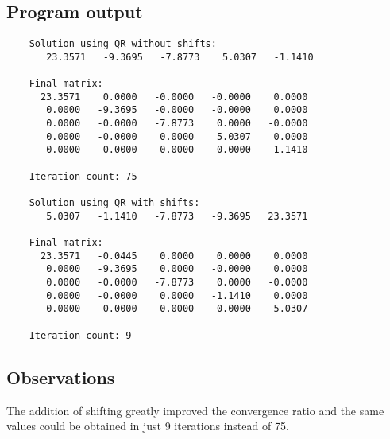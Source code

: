 \documentclass{article}
\begin{document}
	\newpage
	\subsection{Program output}

	\begin{verbatim}
	Solution using QR without shifts:
	   23.3571   -9.3695   -7.8773    5.0307   -1.1410

	Final matrix:
	  23.3571    0.0000   -0.0000   -0.0000    0.0000
	   0.0000   -9.3695   -0.0000   -0.0000    0.0000
	   0.0000   -0.0000   -7.8773    0.0000   -0.0000
	   0.0000   -0.0000    0.0000    5.0307    0.0000
	   0.0000    0.0000    0.0000    0.0000   -1.1410

	Iteration count: 75

	Solution using QR with shifts:
	   5.0307   -1.1410   -7.8773   -9.3695   23.3571

	Final matrix:
	  23.3571   -0.0445    0.0000    0.0000    0.0000
	   0.0000   -9.3695    0.0000   -0.0000    0.0000
	   0.0000   -0.0000   -7.8773    0.0000   -0.0000
	   0.0000   -0.0000    0.0000   -1.1410    0.0000
	   0.0000    0.0000    0.0000    0.0000    5.0307

	Iteration count: 9
	\end{verbatim}

	\subsection{Observations}

	The addition of shifting greatly improved the convergence ratio and the same
	values could be obtained in just 9 iterations instead of 75.
\end{document}
